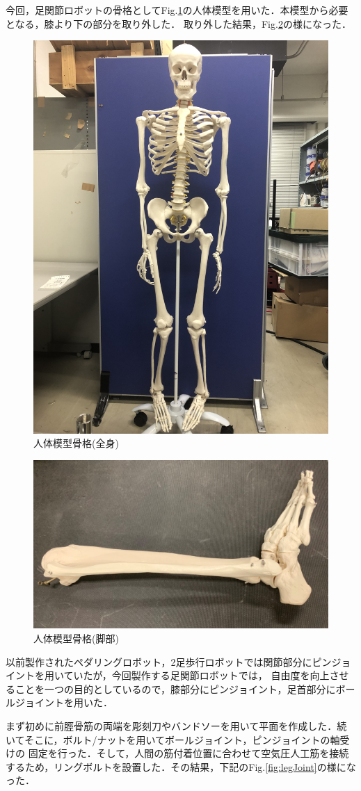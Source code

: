 今回，足関節ロボットの骨格としてFig.\ref{fig:bodyBone}の人体模型を用いた．本模型から必要となる，膝より下の部分を取り外した．
取り外した結果，Fig.\ref{fig:legBone}の様になった．
\begin{figure}[h]
    \begin{center}
     \includegraphics[width=0.4\columnwidth,clip]{./2_measurement/bodyBone.eps}
     \caption{人体模型骨格(全身)}
     \label{fig:bodyBone}
    \end{center}
\end{figure}
\begin{figure}[h]
    \begin{center}
     \includegraphics[width=0.6\columnwidth,clip]{./2_measurement/legBone.eps}
     \caption{人体模型骨格(脚部)}
     \label{fig:legBone}
    \end{center}
\end{figure}
\newpage
以前製作されたペダリングロボット，2足歩行ロボットでは関節部分にピンジョイントを用いていたが，今回製作する足関節ロボットでは，
自由度を向上させることを一つの目的としているので，膝部分にピンジョイント，足首部分にボールジョイントを用いた．

まず初めに前脛骨筋の両端を彫刻刀やバンドソーを用いて平面を作成した．続いてそこに，ボルト/ナットを用いてボールジョイント，ピンジョイントの軸受けの
固定を行った．そして，人間の筋付着位置に合わせて空気圧人工筋を接続するため，リングボルトを設置した．その結果，下記のFig.\ref{fig:legJoint}の様になった．

